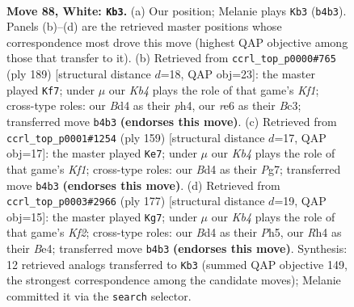 \documentclass[11pt]{article}
\begin{document}
\clearpage

\begin{figure}[p]\centering
\begin{subfigure}{0.46\textwidth}\centering
\resizebox{\linewidth}{!}{%
\newchessgame
\chessboard[
  setfen={5k2/8/4r3/8/1K1Bp2R/5p1P/5P2/8 w - - 1 88},
  showmover=false,
  pgfstyle=straightmove, color=movearrow, markmove={b4-b3}
]}
\caption{}
\end{subfigure}\hfill
\begin{subfigure}{0.46\textwidth}\centering
\resizebox{\linewidth}{!}{%
\newchessgame
\chessboard[
  setfen={5k2/8/3R2p1/4ppP1/7P/2b5/5K2/8 b - - 2 95},
  showmover=false,
  pgfstyle=straightmove, color=movearrow, markmove={f8-f7}
]}
\caption{}
\end{subfigure}
\\[4pt]
\begin{subfigure}{0.46\textwidth}\centering
\resizebox{\linewidth}{!}{%
\newchessgame
\chessboard[
  setfen={5k2/6p1/4P2p/R4P1P/2K5/8/8/5r2 b - - 4 80},
  showmover=false,
  pgfstyle=straightmove, color=movearrow, markmove={f8-e7}
]}
\caption{}
\end{subfigure}\hfill
\begin{subfigure}{0.46\textwidth}\centering
\resizebox{\linewidth}{!}{%
\newchessgame
\chessboard[
  setfen={1R6/5k2/5p2/3p3p/4b2P/8/5KP1/8 b - - 18 89},
  showmover=false,
  pgfstyle=straightmove, color=movearrow, markmove={f7-g7}
]}
\caption{}
\end{subfigure}
\caption{\textbf{Move 88, White: \texttt{Kb3}.} (a) Our position; Melanie plays \texttt{Kb3} (\texttt{b4b3}). Panels (b)--(d) are the retrieved master positions whose correspondence most drove this move (highest QAP objective among those that transfer to it). (b) Retrieved from \texttt{ccrl\_top\_p0000\#765} (ply 189) [structural distance $d$=18, QAP obj=23]: the master played \texttt{Kf7}; under $\mu$ our \emph{Kb4} plays the role of that game's \emph{Kf1}; cross-type roles: our \emph{B}d4 as their \emph{p}h4, our \emph{r}e6 as their \emph{B}c3; transferred move \texttt{b4b3} \textbf{(endorses this move)}. (c) Retrieved from \texttt{ccrl\_top\_p0001\#1254} (ply 159) [structural distance $d$=17, QAP obj=17]: the master played \texttt{Ke7}; under $\mu$ our \emph{Kb4} plays the role of that game's \emph{Kf1}; cross-type roles: our \emph{B}d4 as their \emph{P}g7; transferred move \texttt{b4b3} \textbf{(endorses this move)}. (d) Retrieved from \texttt{ccrl\_top\_p0003\#2966} (ply 177) [structural distance $d$=19, QAP obj=15]: the master played \texttt{Kg7}; under $\mu$ our \emph{Kb4} plays the role of that game's \emph{Kf2}; cross-type roles: our \emph{B}d4 as their \emph{P}h5, our \emph{R}h4 as their \emph{B}e4; transferred move \texttt{b4b3} \textbf{(endorses this move)}. Synthesis: 12 retrieved analogs transferred to \texttt{Kb3} (summed QAP objective 149, the strongest correspondence among the candidate moves); Melanie committed it via the \texttt{search} selector.}
\label{fig:thought-m174}
\end{figure}
\end{document}
